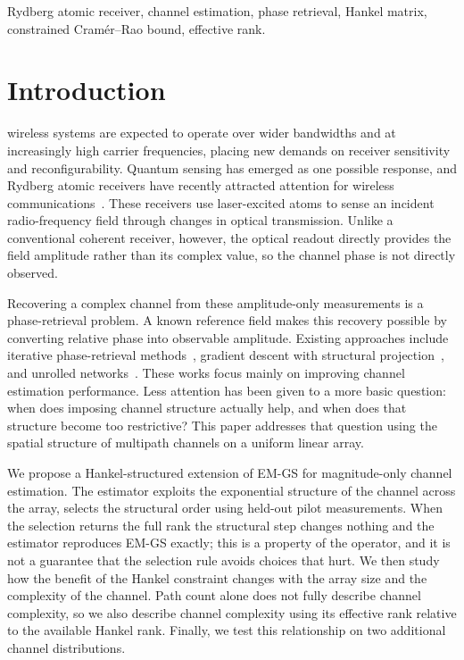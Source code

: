 \documentclass[journal]{IEEEtran}
\begin{document}
\begin{IEEEkeywords}
Rydberg atomic receiver, channel estimation, phase retrieval, Hankel matrix,
constrained Cram\'er--Rao bound, effective rank.
\end{IEEEkeywords}

\section{Introduction}

 wireless systems are expected to operate over
wider bandwidths and at increasingly high carrier frequencies, placing new
demands on receiver sensitivity and reconfigurability. Quantum sensing has
emerged as one possible response, and Rydberg atomic receivers have recently
attracted attention for wireless communications~\cite{cui2025,gong2025mag}.
These receivers use laser-excited atoms to sense an incident radio-frequency
field through changes in optical transmission. Unlike a conventional coherent
receiver, however, the optical readout directly provides the field amplitude
rather than its complex value, so the channel phase is not directly observed.

Recovering a complex channel from these amplitude-only measurements is a
phase-retrieval problem. A known reference field makes this recovery possible
by converting relative phase into observable amplitude. Existing approaches
include iterative phase-retrieval methods~\cite{gerchberg1972}, gradient
descent with structural projection~\cite{xu2025}, and unrolled
networks~\cite{xiao2026}. These works focus mainly on improving channel
estimation performance. Less attention has been given to a more basic question:
when does imposing channel structure actually help, and when does that
structure become too restrictive? This paper addresses that question using the
spatial structure of multipath channels on a uniform linear array.

We propose a Hankel-structured extension of EM-GS for magnitude-only channel
estimation. The estimator exploits the exponential structure of the channel
across the array, selects the structural order using held-out pilot
measurements. When the selection returns the full rank the structural step
changes nothing and the estimator reproduces EM-GS exactly; this is a property
of the operator, and it is not a guarantee that the selection rule avoids
choices that hurt. We then study how the benefit of the Hankel
constraint changes with the array size and the complexity of the channel. Path
count alone does not fully describe channel complexity, so we also describe
channel complexity using its effective rank relative to the available Hankel
rank. Finally, we test this relationship on two additional channel
distributions.
\end{document}
